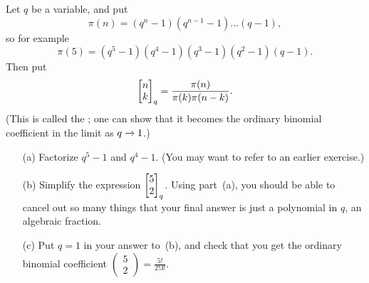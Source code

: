 \documentclass[a4paper]{book}
\theoremstyle{definition}
\newenvironment{starex}{
 \renewcommand{\thetheorem}{\arabic{chapter}.\arabic{section}.\arabic{theorem}${}^*$}
 \exercise
}{\endexercise}
\begin{document}
\begin{starex}
 Let $q$ be a variable, and put
 \[ \pi(n) = (q^n-1)(q^{n-1}-1)\ldots(q-1), \]
 so for example 
 \[ \pi(5)=(q^5-1)(q^4-1)(q^3-1)(q^2-1)(q-1). \]
 Then put
 \[ \begin{bmatrix} n \\ k\end{bmatrix}_q = 
     \frac{\pi(n)}{\pi(k)\pi(n-k)}.
 \]
 (This is called the 
 ; one can show that it becomes the
 ordinary binomial coefficient in the limit as $q\xrightarrow{}1$.)
 
 \begin{itemize}
  \item[(a)] Factorize $q^5-1$ and $q^4-1$.  (You may want to refer to
   an earlier exercise.)
  \item[(b)] Simplify the expression
   $\begin{bmatrix} 5\\ 2\end{bmatrix}_q$.  Using part~(a),
   you should be able to cancel out so many things that your final
   answer is just a polynomial in $q$,  an algebraic
   fraction. 
  \item[(c)] Put $q=1$ in your answer to~(b), and check that you get
   the ordinary binomial coefficient
   $\begin{pmatrix} 5\\2\end{pmatrix}=\frac{5!}{2!3!}$.
 \end{itemize}
\end{starex}
\end{document}
